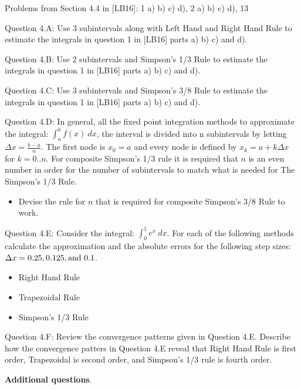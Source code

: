 \documentclass{article}
\renewcommand{\cite}[1]{[#1]}
\def\ds{\displaystyle}
\begin{document}
\par \noindent
Problems from Section 4.4 in \cite{LB16}: 1 a) b) c) d), 2 a) b) c) d), 13
\par \medskip \noindent
%
Question 4.A: Use 3 subintervals along with Left Hand and Right Hand Rule to estimate the integrals in question 1 in \cite{LB16} parts a) b) c) and d). 
\par \medskip \noindent
%
Question 4.B: Use 2 subintervals and Simpson's 1/3 Rule to estimate the integrals in question 1 in \cite{LB16} parts a) b) c) and d). 
\medskip \par \noindent
%
Question 4.C: Use 3 subintervals and Simpson's 3/8 Rule to estimate the integrals in question 1 in \cite{LB16} parts a) b) c) and d). 
  \medskip \par \noindent
%
Question 4.D: In general, all the fixed point integration methods to approximate the integral: $\ds \int_a^b f(x) \ dx$, the interval is divided into n subintervals by letting $\ds \Delta x= \frac {b-a}n$. The first node is $\ds x_0 = a$ and every node is defined by $\ds x_k = a + k\Delta x$ for $k=0..n$. For composite Simpson's 1/3 rule it is required that $n$ is an even number in order for the number of subintervals to match what is needed for The Simpson's 1/3 Rule. 
\begin{itemize}
    \item Devise the rule for $n$ that is required for composite Simpson's 3/8 Rule to work. 
\end{itemize}
\medskip \par \noindent
%
Question 4.E: Consider the integral: $\ds \int_0^1 e^x \ dx$. For each of the following methods calculate the approximation and the absolute errors for the following step sizes: $\ds \Delta x = 0.25, 0.125, {\rm and} \ 0.1$. 
\begin{itemize}
    \item Right Hand Rule
    \item Trapezoidal Rule
    \item Simpson's 1/3 Rule
\end{itemize}
\medskip \par \noindent
%
Question 4.F: Review the convergence patterns given in Question 4.E. Describe how the convergence patters in Question 4.E reveal that Right Hand Rule is first order, Trapezoidal is second order, and Simpson's 1/3 rule is fourth order.  
\medskip \par \noindent
%
{\bf Additional questions}. \medskip \par \noindent
\end{document}
